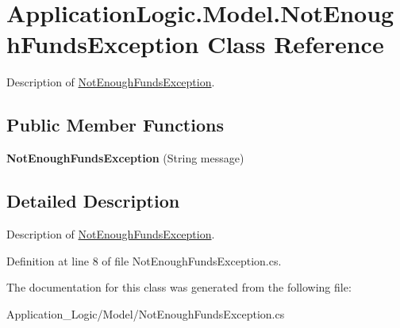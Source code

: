 \hypertarget{class_application_logic_1_1_model_1_1_not_enough_funds_exception}{
\section{ApplicationLogic.Model.NotEnoughFundsException Class Reference}
\label{class_application_logic_1_1_model_1_1_not_enough_funds_exception}
}


Description of \hyperlink{class_application_logic_1_1_model_1_1_not_enough_funds_exception}{NotEnoughFundsException}.  


\subsection*{Public Member Functions}
\begin{DoxyCompactItemize}
\item 
\hypertarget{class_application_logic_1_1_model_1_1_not_enough_funds_exception_a205b7880c8363fcad6052cd305438c2e}{
{\bfseries NotEnoughFundsException} (String message)}
\label{class_application_logic_1_1_model_1_1_not_enough_funds_exception_a205b7880c8363fcad6052cd305438c2e}

\end{DoxyCompactItemize}


\subsection{Detailed Description}
Description of \hyperlink{class_application_logic_1_1_model_1_1_not_enough_funds_exception}{NotEnoughFundsException}. 

Definition at line 8 of file NotEnoughFundsException.cs.



The documentation for this class was generated from the following file:\begin{DoxyCompactItemize}
\item 
Application\_\-Logic/Model/NotEnoughFundsException.cs\end{DoxyCompactItemize}
